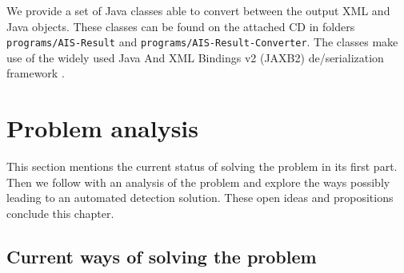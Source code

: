 We provide a set of Java classes able to convert between the output XML and Java objects. These classes can be found on the attached CD in folders \texttt{programs/AIS-Result} and \texttt{programs/AIS-Result-Converter}. The classes make use of the widely used Java And XML Bindings v2 (JAXB2) de/serialization framework \citep{Java.net2013}.

\section{Problem analysis}
This section mentions the current status of solving the problem in its first part. Then we follow with an analysis of the problem and explore the ways possibly leading to an automated detection solution. These open ideas and propositions conclude this chapter.

\subsection{Current ways of solving the problem}  







